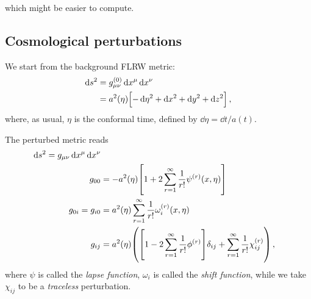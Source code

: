 \documentclass[main.tex]{subfiles}
\begin{document}
%
%

which might be easier to compute. 

\subsection{Cosmological perturbations}

We start from the background FLRW metric: 
%
\begin{align}
\dd{s^2} &= g_{\mu \nu }^{(0)} \dd{x^{\mu }} \dd{x^{\nu }}  \\
&= a^2(\eta ) \qty[- \dd{\eta^2} + \dd{x^2} + \dd{y^2} + \dd{z^2}]
\,,
\end{align}
%
where, as usual, \(\eta \) is the conformal time, defined by \(\dd{\eta } = \dd{t} / a(t)\). 

The perturbed metric reads 
%
\begin{align}
\dd{s^2} = g_{\mu \nu } \dd{x^{\mu }} \dd{x^{\nu }}  \\
g_{00} &= - a^2(\eta ) \qty[1 + 2 \sum _{r=1}^{\infty } \frac{1}{r!} \psi^{(r)} (x, \eta )]  \\
g_{0i } = g_{i0} &= a^2(\eta ) \sum _{r=1}^{\infty } \frac{1}{r!} \omega_{i}^{(r)} (x, \eta )  \\
g_{ij } &= a^2(\eta ) \qty( \qty[1 - 2 \sum _{r=1}^{\infty } \frac{1}{r!} \phi^{(r)}] \delta_{ij} + \sum _{r=1}^{\infty } \frac{1}{r! } \chi_{ij}^{(r)})
\,,
\end{align}
%
where \(\psi\) is called the \emph{lapse function}, \(\omega_{i} \) is called the \emph{shift function}, while we take \(\chi_{ij}\) to be a \emph{traceless} perturbation.
\end{document}
